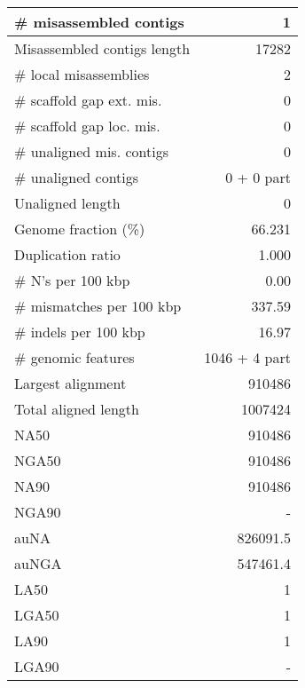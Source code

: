 \documentclass[12pt,a4paper]{article}
\begin{document}
\begin{table}[ht]
\begin{center}
\begin{tabular}{|l*{1}{|r}|}
\# misassembled contigs & 1 \\ \hline
Misassembled contigs length & 17282 \\ \hline
\# local misassemblies & 2 \\ \hline
\# scaffold gap ext. mis. & 0 \\ \hline
\# scaffold gap loc. mis. & 0 \\ \hline
\# unaligned mis. contigs & 0 \\ \hline
\# unaligned contigs & 0 + 0 part \\ \hline
Unaligned length & 0 \\ \hline
Genome fraction (\%) & 66.231 \\ \hline
Duplication ratio & 1.000 \\ \hline
\# N's per 100 kbp & 0.00 \\ \hline
\# mismatches per 100 kbp & 337.59 \\ \hline
\# indels per 100 kbp & 16.97 \\ \hline
\# genomic features & 1046 + 4 part \\ \hline
Largest alignment & 910486 \\ \hline
Total aligned length & 1007424 \\ \hline
NA50 & 910486 \\ \hline
NGA50 & 910486 \\ \hline
NA90 & 910486 \\ \hline
NGA90 & - \\ \hline
auNA & 826091.5 \\ \hline
auNGA & 547461.4 \\ \hline
LA50 & 1 \\ \hline
LGA50 & 1 \\ \hline
LA90 & 1 \\ \hline
LGA90 & - \\ \hline
\end{tabular}
\end{center}
\end{table}
\end{document}
